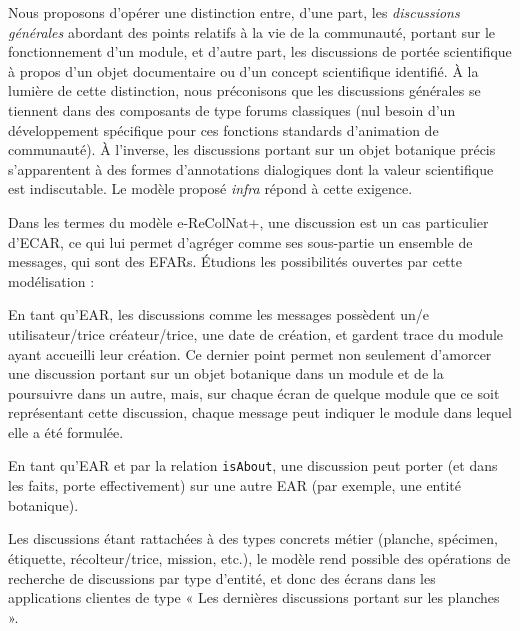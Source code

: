 \startchapter[title={Le modèle de discussions}]

\startsection[title={Discussions ciblées & discussions générales}]

Nous proposons d'opérer une distinction entre, d'une part, les {\em discussions générales} abordant des points relatifs à la vie de la communauté, portant sur le fonctionnement d'un module, et d'autre part, les discussions de portée scientifique à propos d'un objet documentaire ou d'un concept scientifique identifié.
À la lumière de cette distinction, nous préconisons que les discussions générales se tiennent dans des composants de type forums classiques (nul besoin d'un développement spécifique pour ces fonctions standards d'animation de communauté).
À l'inverse, les discussions portant sur un objet botanique précis s'apparentent à des formes d'annotations dialogiques dont la valeur scientifique est indiscutable.
Le modèle proposé {\it infra} répond à cette exigence.

\stopsection
\startsection[title={Le modèle de discussions},reference=model:discussions]


Dans les termes du modèle e-ReColNat+, une discussion est un cas particulier d'ECAR, ce qui lui permet d'agréger comme ses sous-partie un ensemble de messages, qui sont des EFARs.
Étudions les possibilités ouvertes par cette modélisation :

\startitemize
\item En tant qu'EAR, les discussions comme les messages possèdent un/e utilisateur/trice créateur/trice, une date de création, et gardent trace du module ayant accueilli leur création. Ce dernier point permet non seulement d'amorcer une discussion portant sur un objet botanique dans un module et de la poursuivre dans un autre, mais, sur chaque écran de quelque module que ce soit représentant cette discussion, chaque message peut indiquer le module dans lequel elle a été formulée.
\item En tant qu'EAR et par la relation {\tt isAbout}, une discussion peut porter (et dans les faits, porte effectivement) sur une autre EAR (par exemple, une entité botanique).
\item Les discussions étant rattachées à des types concrets métier (planche, spécimen, étiquette, récolteur/trice, mission, etc.), le modèle rend possible des opérations de recherche de discussions par type d'entité, et donc des écrans dans les applications clientes de type « Les dernières discussions portant sur les planches ».
\stopitemize

\stopsection
\stopchapter
